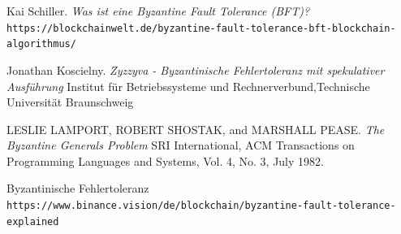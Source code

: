 \documentclass[12pt]{article}
\begin{document}
%
%
\begin{thebibliography}{5}
%

Kai Schiller.
\textit{Was ist eine Byzantine Fault Tolerance (BFT)?}
\texttt{https://blockchainwelt.de/byzantine-fault-tolerance-bft-blockchain-algorithmus/}

Jonathan Koscielny.
\textit{Zyzzyva - Byzantinische Fehlertoleranz mit spekulativer Ausführung}\newline
Institut für Betriebssysteme und Rechnerverbund,Technische Universität Braunschweig


LESLIE LAMPORT, ROBERT SHOSTAK, and MARSHALL PEASE.
\textit{The Byzantine Generals Problem}\newline
SRI International, ACM Transactions on Programming Languages and Systems, Vol. 4, No. 3, July 1982. 

Byzantinische Fehlertoleranz\newline
\texttt{https://www.binance.vision/de/blockchain/byzantine-fault-tolerance-explained}



\end{thebibliography}
\end{document}
